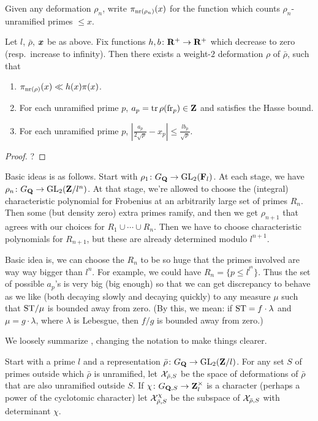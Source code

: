 Given any deformation $\rho_n$, write $\pi_{\mathrm{nr}(\rho_n)}(x)$ for the function 
which counts $\rho_n$-unramified primes $\leqslant x$. 

\begin{theorem}\label{thm:master-Galois}
Let $l$, $\bar\rho$, ${\boldsymbol x}$ be as above. Fix functions 
$h,b\colon \mathbf{R}^+\to \mathbf{R}^+$ which decrease to zero (resp.~increase to infinity). 
Then there exists a weight-$2$ deformation $\rho$ of $\bar\rho$, such that 
\begin{enumerate}
\item
$\pi_{\mathrm{nr}(\rho)}(x) \ll h(x) \pi(x)$. 

\item
For each unramified prime $p$, $a_p=\operatorname{tr}\rho(\mathrm{fr}_p)\in \mathbf{Z}$ and satisfies the 
Hasse bound. 

\item
For each unramified prime $p$, 
$\left| \frac{a_p}{2\sqrt p} - x_p\right| \leqslant \frac{l b_p}{\sqrt p}$. 
\end{enumerate}
\end{theorem}
\begin{proof}
?
\end{proof}


Basic ideas is as follows. Start with $\rho_1\colon G_{\mathbf{Q}} \to \operatorname{GL}_2(\mathbf{F}_l)$. At 
each stage, we have $\rho_n\colon G_{\mathbf{Q}} \to \operatorname{GL}_2(\mathbf{Z}/l^n)$. At that stage, 
we're allowed to choose the (integral) characteristic polynomial for Frobenius 
at an arbitrarily large set of primes $R_n$. Then some (but density zero) extra 
primes ramify, and then we get $\rho_{n+1}$ that agrees with our choices for 
$R_1\cup \cdots \cup R_n$. Then we have to choose characteristic polynomials for 
$R_{n+1}$, but these are already determined modulo $l^{n+1}$. 

Basic idea is, we can choose the $R_n$ to be so huge that the primes involved are 
way way bigger than $l^n$. For example, we could have 
$R_n=\{p\leqslant l^{l^n}\}$. Thus the set of possible $a_p$'s is very big (big 
enough) so that we can get discrepancy to behave as we like (both decaying 
slowly and decaying quickly) to any measure $\mu$ such that $\mathrm{ST}/\mu$ is 
bounded away from zero. (By this, we mean: if $\mathrm{ST}=f\cdot\lambda$ and 
$\mu = g\cdot\lambda$, where $\lambda$ is Lebesgue, then $f/g$ is bounded away 
from zero.)

We loosely summarize \cite{pande-2011}, changing the notation to make things 
clearer. 

Start with a prime $l$ and a representation 
$\bar\rho\colon G_{\mathbf{Q}} \to \operatorname{GL}_2(\mathbf{Z}/l)$. For any set $S$ of primes outside 
which $\bar\rho$ is unramified, let $\mathcal{X}_{\bar\rho,S}$ be the space of 
deformations of $\bar\rho$ that are also unramified outside $S$. If 
$\chi\colon G_{\mathbf{Q},S} \to \mathbf{Z}_l^\times$ is a character (perhaps a power of the 
cyclotomic character) let $\mathcal{X}_{\bar\rho,S}^\chi$ be the subspace of 
$\mathcal{X}_{\bar\rho,S}$ with determinant $\chi$. 

